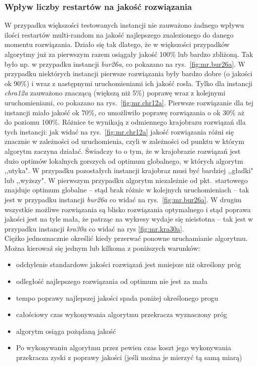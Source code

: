 \documentclass{article}
\begin{document}
		\subsubsection{Wpływ liczby restartów na jakość rozwiązania}		
			W przypadku większości testowanych instancji nie zauważono żadnego wpływu ilości restartów multi-random na jakość najlepszego znalezionego do danego momentu rozwiązania. Działo się tak dlatego, że w większości przypadków algorytmy już za pierwszym razem osiągały jakość  100\%  lub bardzo zbliżoną. Tak było np. w przypadku instancji \emph{bur26a}, co pokazano na rys.~\ref{fig:mr.bur26a}. W przypadku niektórych instancji pierwsze rozwiązania były bardzo dobre (o jakości ok 90\%) i wraz z następnymi uruchomieniami ich jakość rosła. Tylko dla instancji \emph{chra12a} zauważono znaczącą (większą niż 5\%) poprawę wraz z kolejnymi uruchomieniami, co pokazano na rys.~\ref{fig:mr.chr12a}. Pierwsze rozwiązanie dla tej instancji miało jakość ok 70\%, co umożliwiło poprawę rozwiązania o ok 30\% aż do poziomu 100\%. Różnice te wynikają z odmiennego krajobrazu rozwiązań dla tych instancji: jak widać na rys.~\ref{fig:mr.chr12a} jakość rozwiązania różni się znacznie w zależności od uruchomienia, czyli w zależności od punktu w którym algorytm zaczyna działać. Świadczy to o tym, że w krajobrazie rozwiązań jest dużo optimów lokalnych gorszych od optimum globalnego, w których algorytm ,,utyka". W przypadku pozostałych instancji krajobraz musi być bardziej ,,gładki" lub ,,wyższy". W pierwszym przypadku algorytm niezależnie od pkt.~startowego znajduje optimum globalne -- stąd brak różnic w kolejnych uruchomieniach -- tak jest w przypadku instancji \emph{bur26a} co widać na rys.~\ref{fig:mr.bur26a}. W drugim wszystkie możliwe rozwiązania są blisko rozwiązania optymalnego i stąd poprawa jakości jest na tyle mała, że patrząc na wykresy wydaje się nieistotna -- tak jest w przypadku instancji \emph{kra30a} co widać na rys \ref{fig:mr.kra30a}.
			\\Ciężko jednoznacznie określić kiedy przerwać ponowne uruchamianie algorytmu. Można kierowaź się jednym lub kilkoma z poniższych warunków:
			\begin{itemize}
				\item{odchylenie standardowe jakości rozwiązań jest mniejsze niż określony próg}
				\item{odległość najlepszego rozwiązania od optimum nie jest za mała}
				\item{tempo poprawy najlepszej jakości spada poniżej określonego progu}
				\item{całościowy czas wykonywania algorytmu przekracza wyznaczony próg}
				\item{algorytm osiąga pożądaną jakość}
				\item{Po wykonywaniu algorytmu przez pewien czas koszt jego wykonywania przekracza zyski z poprawy jakości (jeśli można je mierzyć tą samą miarą)}
			\end{itemize}
\end{document}
